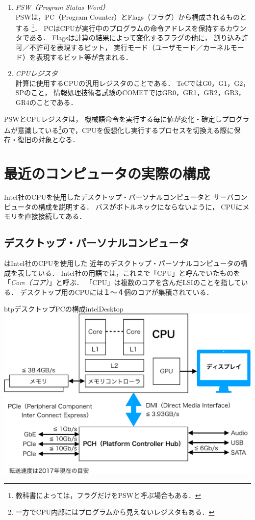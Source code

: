 \begin{enumerate}
\item \emph{PSW（Program Status Word）} \\
  PSWは，PC（Program Counter）とFlags（フラグ）から構成されるものとする
  \footnote{
    教科書によっては，フラグだけをPSWと呼ぶ場合もある．}．
  PCはCPUが実行中のプログラムの命令アドレスを保持するカウンタである．
  Flagsは計算の結果によって変化するフラグの他に，
  割り込み許可／不許可を表現するビット，
  実行モード（ユーザモード／カーネルモード）を表現するビット等が含まれる．
\item \emph{CPUレジスタ} \\
  計算に使用するCPUの汎用レジスタのことである．
  TeCではG0，G1，G2，SPのこと，
  情報処理技術者試験のCOMETではGR0，GR1，GR2，GR3，GR4のことである．
\end{enumerate}

PSWとCPUレジスタは，
機械語命令を実行する毎に値が変化・確定しプログラムが意識している\footnote{
  一方でCPU内部にはプログラムから見えないレジスタもある．
}ので，CPUを仮想化し実行するプロセスを切換える際に保存・復旧の対象となる．

\section{最近のコンピュータの実際の構成}
Intel社のCPUを使用したデスクトップ・パーソナルコンピュータと
サーバコンピュータの構成を説明する．
バスがボトルネックにならないように，
CPUにメモリを直接接続してある．

\subsection{デスクトップ・パーソナルコンピュータ}
はIntel社のCPUを使用した
近年のデスクトップ・パーソナルコンピュータの構成を表している．
Intel社の用語では，これまで「CPU」と呼んでいたものを
「\emph{Core（コア）}」と呼ぶ．
「CPU」は複数のコアを含んだLSIのことを指している．
デスクトップ用のCPUには１〜４個のコアが集積されている．

\begin{myfig}{btp}{デスクトップPCの構成}{intelDesktop}
  \includegraphics[scale=0.66]{Fig/intelDesktop-crop.pdf}
\end{myfig}

